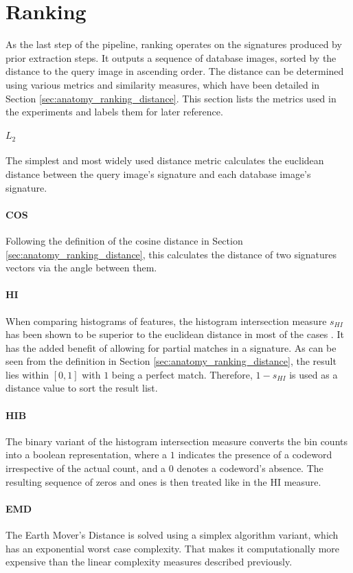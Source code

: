 \section{Ranking}

As the last step of the pipeline, ranking operates on the signatures produced
by prior extraction steps. It outputs a sequence of database images, sorted by
the distance to the query image in ascending order. The distance can be
determined using various metrics and similarity measures, which have been
detailed in Section \ref{sec:anatomy_ranking_distance}. This section lists the
metrics used in the experiments and labels them for later reference.

\paragraph{$L_2$}

The simplest and most widely used distance metric calculates the euclidean
distance between the query image's signature and each database image's
signature.

\paragraph{COS}

Following the definition of the cosine distance in Section
\ref{sec:anatomy_ranking_distance}, this calculates the distance of two
signatures vectors via the angle between them.

\paragraph{HI}

When comparing histograms of features, the histogram intersection measure
$s_{HI}$ has been shown to be superior to the euclidean distance in most of the
cases \autocite{wu_beyond_2009}. It has the added benefit of allowing for
partial matches in a signature. As can be seen from the definition in Section
\ref{sec:anatomy_ranking_distance}, the result lies within $[0, 1]$ with $1$
being a perfect match. Therefore, $1 - s_{HI}$ is used as a distance value to
sort the result list.

\paragraph{HIB}

The binary variant of the histogram intersection measure converts the bin
counts into a boolean representation, where a $1$ indicates the presence of a
codeword irrespective of the actual count, and a $0$ denotes a codeword's
absence. The resulting sequence of zeros and ones is then treated like in the
HI measure.

\paragraph{EMD}

The Earth Mover's Distance is solved using a simplex algorithm variant, which
has an exponential worst case complexity. That makes it computationally more
expensive than the linear complexity measures described previously.
